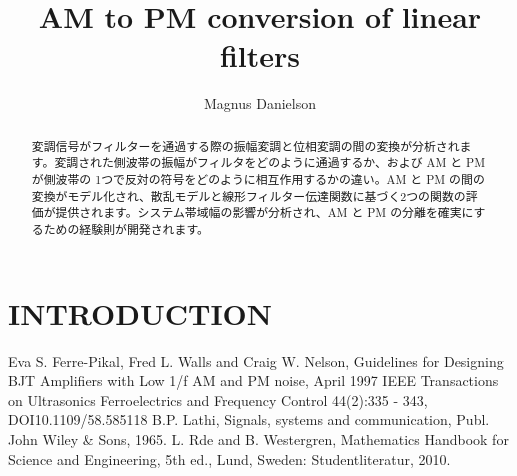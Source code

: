 \documentclass[article]{jlreq}
\begin{document}
\title{AM to PM conversion of linear filters}
\author{Magnus Danielson}
\maketitle

\begin{abstract}
    変調信号がフィルターを通過する際の振幅変調と位相変調の間の変換が分析されます。変調された側波帯の振幅がフィルタをどのように通過するか、および AM と PM が側波帯の 1つで反対の符号をどのように相互作用するかの違い。AM と PM の間の変換がモデル化され、散乱モデルと線形フィルター伝達関数に基づく2つの関数の評価が提供されます。システム帯域幅の影響が分析され、AM と PM の分離を確実にするための経験則が開発されます。
\end{abstract}

\section{INTRODUCTION}
%

%
\begin{thebibliography}{9}
    Eva S. Ferre-Pikal, Fred L. Walls and Craig W. Nelson, Guidelines for Designing BJT Amplifiers with Low 1/f AM and PM noise, April 1997 IEEE Transactions on Ultrasonics Ferroelectrics and Frequency Control 44(2):335 - 343, DOI10.1109/58.585118
    B.P. Lathi, Signals, systems and communication, Publ. John Wiley \& Sons, 1965.
    L. Rde and B. Westergren, Mathematics Handbook for Science and Engineering, 5th ed., Lund, Sweden: Studentliteratur, 2010.
\end{thebibliography}
%
%
\end{document}
